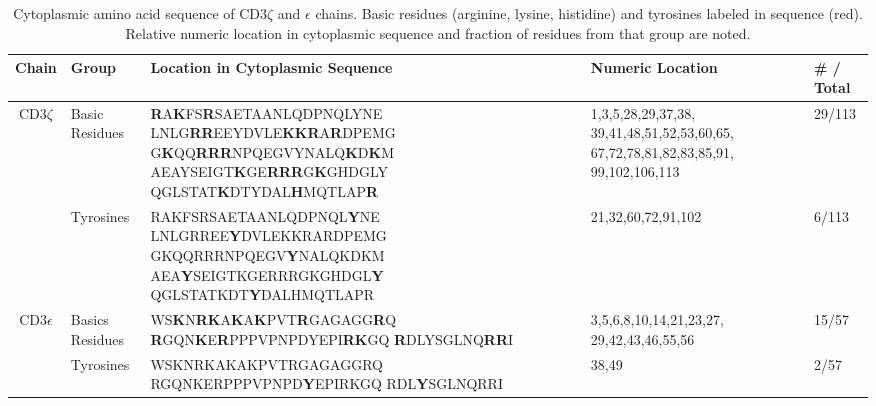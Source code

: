 \documentclass[../../AdvancementSummary.tex]{subfiles}
\begin{document}
\begin{table}[H]
    \caption{Cytoplasmic amino acid sequence of CD3$\zeta$ and $\epsilon$ chains.  Basic residues (arginine, lysine, histidine) and tyrosines labeled in sequence (red).  Relative numeric location in cytoplasmic sequence and fraction of residues from that group are noted. \label{table: BasicsYLocation}}
    \begin{center}
    \begin{tabular}{|c|p{2cm}|p{6cm}|p{3.5cm}|p{1.6cm}|}
    	\hline
	Chain 		& 		Group			&		Location in Cytoplasmic Sequence	&	Numeric Location		&		\# / Total	\\
	\hline
	
	
    	\multicolumn{1}{|c|}{\multirow{2}[0]{*}{CD3$\zeta$}} 	&  	Basic Residues				& 	
	
	\textbf{\color{red}R}A\textbf{\color{red}K}FS\textbf{\color{red}R}SAETAANLQDPNQLYNE
	LNLG\textbf{\color{red}RR}EEYDVLE\textbf{\color{red}KKR}A\textbf{\color{red}R}DPEMG
	G\textbf{\color{red}K}QQ\textbf{\color{red}RRR}NPQEGVYNALQ\textbf{\color{red}K}D\textbf{\color{red}K}M
	AEAYSEIGT\textbf{\color{red}K}GE\textbf{\color{red}RRR}G\textbf{\color{red}K}GHDGLY
	QGLSTAT\textbf{\color{red}K}DTYDAL\textbf{\color{red}H}MQTLAP\textbf{\color{red}R}		& 	
	
	1,3,5,28,29,37,38,
	39,41,48,51,52,53,60,65,
	67,72,78,81,82,83,85,91,
	99,102,106,113 		& 	
	
	29/113	\\
	\cline{2-5}
	
	
	
		&	 Tyrosines									&	
	
	RAKFSRSAETAANLQDPNQL\textbf{\color{red}Y}NE
	LNLGRREE\textbf{\color{red}Y}DVLEKKRARDPEMG
	GKQQRRRNPQEGV\textbf{\color{red}Y}NALQKDKM
	AEA\textbf{\color{red}Y}SEIGTKGERRRGKGHDGL\textbf{\color{red}Y}
	QGLSTATKDT\textbf{\color{red}Y}DALHMQTLAPR 				& 	
	
	21,32,60,72,91,102											&	
	
	6/113			\\
	\hline
	
	
	\multicolumn{1}{|c|}{\multirow{2}{*}{CD3$\epsilon$}}	&	 Basics Residues		&
	
	WS\textbf{\color{red}K}N\textbf{\color{red}RK}A\textbf{\color{red}K}A\textbf{\color{red}K}PVT\textbf{\color{red}R}GAGAGG\textbf{\color{red}R}Q
	\textbf{\color{red}R}GQN\textbf{\color{red}K}E\textbf{\color{red}R}PPPVPNPDYEPI\textbf{\color{red}RK}GQ
	\textbf{\color{red}R}DLYSGLNQ\textbf{\color{red}RR}I					& 	
	
	3,5,6,8,10,14,21,23,27,
	29,42,43,46,55,56	&		
	
	15/57	\\
	\cline{2-5}
	
	
		&		 Tyrosines				& 	
	
	WSKNRKAKAKPVTRGAGAGGRQ
	RGQNKERPPPVPNPD\textbf{\color{red}Y}EPIRKGQ
	RDL\textbf{\color{red}Y}SGLNQRRI			&
	
	 38,49		& 		
	 
	 2/57			\\
	\hline
    \end{tabular}
    \end{center}
\end{table}
\end{document}
